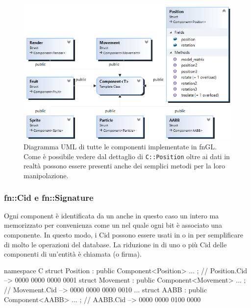 \begin{figure}[!htp]
	\centering
	\includegraphics[width=0.95\linewidth]{images/ch20/6}
	\caption{Diagramma UML di tutte le componenti implementate in fnGL. Come è possibile vedere dal dettaglio di \texttt{C::Position} oltre ai dati in realtà possono essere presenti anche dei semplici metodi per la loro manipolazione.}
	\label{fig:6}
\end{figure}

\subsubsection{fn::Cid e fn::Signature}
Ogni component è identificata da un  anche in questo caso un intero ma memorizzato per convenienza come un  nel quale ogni bit è associato una componente. In questo modo, i Cid possono essere usati in  o in  per semplificare di molto le operazioni del database. La riduzione in  di uno o più Cid  delle componenti di un'entità è chiamata  (o firma).

\begin{cpp}[caption={
		Tutti i Cid delle varie componenti sono generati durante la compilazione in contemporanea con la risoluzione de template da parte del compilatore.  
	}, captionpos=t]
 namespace C {
     struct Position : public Component<Position> { ... };
     // Position.Cid  -->  0000 0000 0000 0001  
     struct Movement : public Component<Movement> { ... };
     // Movement.Cid  -->  0000 0000 0000 0010  
     ...
     struct AABB : public Component<AABB> { ... };
     // AABB.Cid  -->  0000 0000 0100 0000
 }  
\end{cpp}

